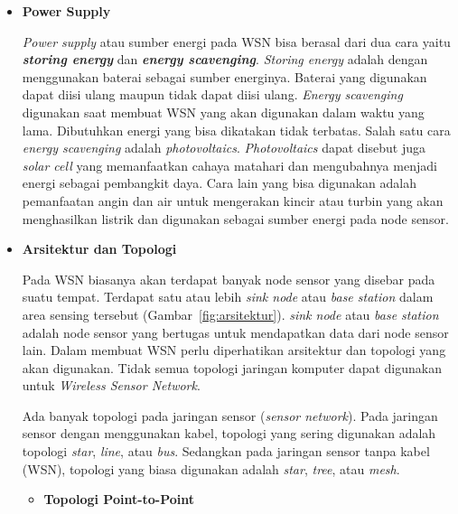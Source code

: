 \documentclass[a4paper,twoside]{article}
\begin{document}
\begin{enumerate}
\begin{itemize}
\begin{itemize}
\begin{table} [H]
\begin{tabular}{|p{6cm}|p{9cm}|}
		\bottomrule
		
	\end{tabular} 
\end{table}
\end{itemize}

\begin{itemize}
\item \textbf{Power Supply}

\textit{Power supply} atau sumber energi pada WSN bisa berasal dari dua cara yaitu \textbf{\textit{storing energy}} dan \textbf{\textit{energy scavenging}}. \textit{Storing energy} adalah dengan menggunakan baterai sebagai sumber energinya. Baterai yang digunakan dapat diisi ulang maupun tidak dapat diisi ulang. \textit{Energy scavenging} digunakan saat membuat WSN yang akan digunakan dalam waktu yang lama. Dibutuhkan energi yang bisa dikatakan tidak terbatas. Salah satu cara \textit{energy scavenging} adalah \textit{photovoltaics}. \textit{Photovoltaics} dapat disebut juga \textit{solar cell} yang memanfaatkan cahaya matahari dan mengubahnya menjadi energi sebagai pembangkit daya. Cara lain yang bisa digunakan adalah pemanfaatan angin dan air untuk mengerakan kincir atau turbin yang akan menghasilkan listrik dan digunakan sebagai sumber energi pada node sensor.
\end{itemize}
\end{itemize}
		
		\begin{itemize}
		\item \textbf{Arsitektur dan Topologi}
		
		Pada WSN biasanya akan terdapat banyak node sensor yang disebar pada suatu tempat. Terdapat satu atau lebih \textit{sink node} atau \textit{base station} dalam area sensing tersebut (Gambar~\ref{fig:arsitektur}). \textit{sink node} atau \textit{base station} adalah node sensor yang bertugas untuk mendapatkan data dari node sensor lain. Dalam membuat WSN perlu diperhatikan arsitektur dan topologi yang akan digunakan. Tidak semua topologi jaringan komputer dapat digunakan untuk \textit{Wireless Sensor Network}. 

Ada banyak topologi pada jaringan sensor (\textit{sensor network}). Pada jaringan sensor dengan menggunakan kabel, topologi yang sering digunakan adalah topologi \textit{star}, \textit{line}, atau \textit{bus}. Sedangkan pada jaringan sensor tanpa kabel (WSN), topologi yang biasa digunakan adalah \textit{star}, \textit{tree}, atau \textit{mesh}. 

\begin{itemize}
\item \textbf{Topologi Point-to-Point}


\end{itemize}
\end{itemize}
\end{enumerate}
\end{document}
